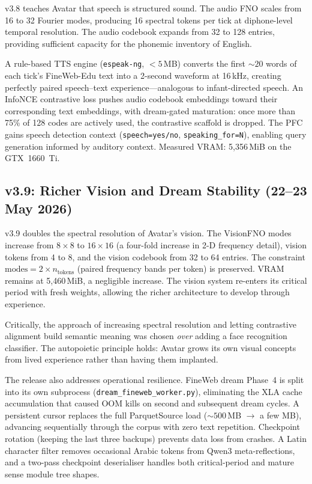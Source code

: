 \documentclass[11pt,a4paper]{article}
\begin{document}
v3.8 teaches Avatar that speech is structured sound. The audio FNO scales from
16 to 32 Fourier modes, producing 16 spectral tokens per tick at diphone-level
temporal resolution. The audio codebook expands from 32 to 128 entries,
providing sufficient capacity for the phonemic inventory of English.

A rule-based TTS engine (\texttt{espeak-ng}, ${<}5$\,MB) converts the first
${\sim}20$ words of each tick's FineWeb-Edu text into a 2-second waveform at
16\,kHz, creating perfectly paired speech--text experience---analogous to
infant-directed speech. An InfoNCE contrastive loss pushes audio codebook
embeddings toward their corresponding text embeddings, with dream-gated
maturation: once more than 75\% of 128 codes are actively used, the contrastive
scaffold is dropped. The PFC gains speech detection context
(\texttt{speech=yes/no}, \texttt{speaking\_for=N}), enabling query generation
informed by auditory context. Measured VRAM: 5,356\,MiB on the GTX~1660~Ti.

\subsection{v3.9: Richer Vision and Dream Stability (22--23 May 2026)}

v3.9 doubles the spectral resolution of Avatar's vision. The VisionFNO modes
increase from $8{\times}8$ to $16{\times}16$ (a four-fold increase in 2-D
frequency detail), vision tokens from 4 to 8, and the vision codebook from 32
to 64 entries. The constraint $\text{modes} = 2 \times n_\text{tokens}$
(paired frequency bands per token) is preserved. VRAM remains at 5,460\,MiB,
a negligible increase. The vision system re-enters its critical period with
fresh weights, allowing the richer architecture to develop through experience.

Critically, the approach of increasing spectral resolution and letting
contrastive alignment build semantic meaning was chosen \emph{over} adding a
face recognition classifier. The autopoietic principle holds: Avatar grows its
own visual concepts from lived experience rather than having them implanted.

The release also addresses operational resilience. FineWeb dream Phase~4 is
split into its own subprocess (\texttt{dream\_fineweb\_worker.py}), eliminating
the XLA cache accumulation that caused OOM kills on second and subsequent dream
cycles. A persistent cursor replaces the full ParquetSource load
(${\sim}500$\,MB $\to$ a few MB), advancing sequentially through the corpus
with zero text repetition. Checkpoint rotation (keeping the last three backups)
prevents data loss from crashes. A Latin character filter removes occasional
Arabic tokens from Qwen3 meta-reflections, and a two-pass checkpoint
deserialiser handles both critical-period and mature sense module tree shapes.
\end{document}
